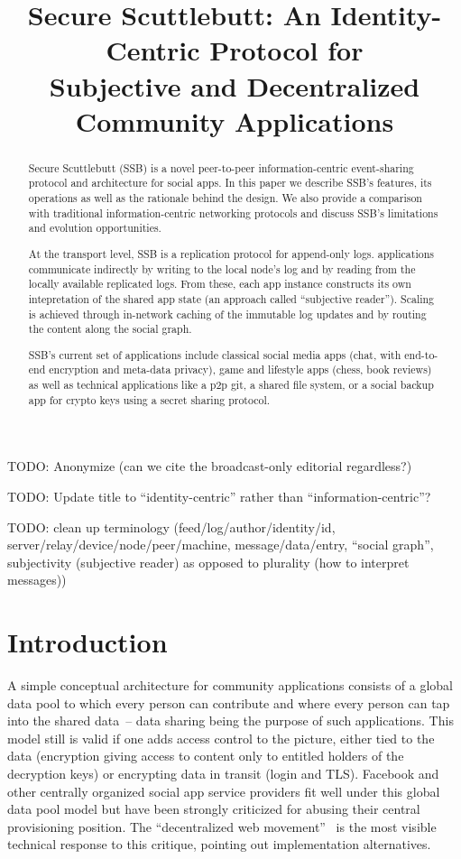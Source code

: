\documentclass[10pt,sigconf]{acmart}
\title{Secure Scuttlebutt: An Identity-Centric Protocol for\\
\hspace*{-0.5cm} Subjective and Decentralized Community Applications\hspace*{-0.5cm} }
\begin{document}
TODO: Anonymize (can we cite the broadcast-only editorial regardless?)

TODO: Update title to ``identity-centric'' rather than ``information-centric''?

TODO: clean up terminology (feed/log/author/identity/id, server/relay/device/node/peer/machine, message/data/entry, ``social graph'', subjectivity (subjective reader) as opposed to plurality (how to interpret messages))

\begin{abstract}
  Secure Scuttlebutt (SSB) is a novel peer-to-peer information-centric
  event-sharing protocol and architecture for social apps. In this
  paper we describe SSB's features, its operations as well as the
  rationale behind the design. We also provide a comparison with
  traditional information-centric networking protocols and discuss
  SSB's limitations and evolution opportunities.

  At the transport level, SSB is a replication protocol for
  append-only logs.  applications communicate indirectly by writing to
  the local node's log and by reading from the locally available
  replicated logs. From these, each app instance constructs its own
  intepretation of the shared app state (an approach called
  ``subjective reader'').  Scaling is achieved through in-network
  caching of the immutable log updates and by routing the content
  along the social graph.

  SSB's current set of applications include classical social media
  apps (chat, with end-to-end encryption and meta-data privacy), game
  and lifestyle apps (chess, book reviews) as well as technical
  applications like a p2p git, a shared file system, or a social
  backup app for crypto keys using a secret sharing protocol.
\end{abstract}

\maketitle


\section{Introduction}

A simple conceptual architecture for community applications consists
of a global data pool to which every person can contribute and where
every person can tap into the shared data~-- data sharing being the
purpose of such applications. This model still is valid if one adds
access control to the picture, either tied to the data (encryption
giving access to content only to entitled holders of the decryption
keys) or encrypting data in transit (login and TLS). Facebook and
other centrally organized social app service providers fit well under
this global data pool model but have been strongly criticized for
abusing their central provisioning position.  The ``decentralized web
movement''~\cite{decent-2018-aug} is the most visible technical
response to this critique, pointing out implementation alternatives.
\end{document}
